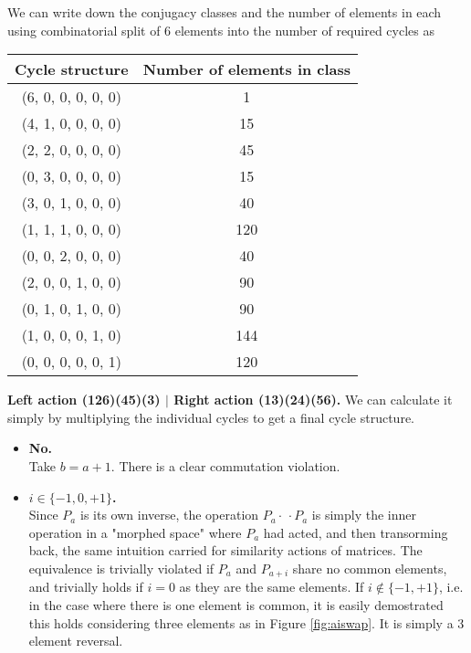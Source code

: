 \begin{alphaparts}
    \questionpart
    We can write down the conjugacy classes and the number of elements in each using 
    combinatorial split of 6 elements into the number of required cycles as 
    \begin{center}
        \begin{tabular*}{0.5\textwidth}[ht]{c c}
            Cycle structure     &  Number of elements in class \\ 
                             \hline
            (6, 0, 0, 0, 0, 0)  &  1                           \\
            (4, 1, 0, 0, 0, 0)  &  15                          \\
            (2, 2, 0, 0, 0, 0)  &  45                          \\
            (0, 3, 0, 0, 0, 0)  &  15                          \\
            (3, 0, 1, 0, 0, 0)  &  40                          \\
            (1, 1, 1, 0, 0, 0)  &  120                         \\
            (0, 0, 2, 0, 0, 0)  &  40                          \\
            (2, 0, 0, 1, 0, 0)  &  90                          \\
            (0, 1, 0, 1, 0, 0)  &  90                          \\
            (1, 0, 0, 0, 1, 0)  &  144                         \\
            (0, 0, 0, 0, 0, 1)  &  120                         \\
        
        \end{tabular*}
    \end{center}

    \textbf{Left action (126)(45)(3) $\mid$ Right action (13)(24)(56).} 
    We can calculate it simply by multiplying the individual
    cycles to get a final cycle structure.

    \questionpart
    \begin{itemize}
        \item \textbf{No.} \\
        Take $b = a + 1$. There is a clear commutation violation.
    
        \item \textbf{$i \in \{-1, 0, +1\}$.} \\
        Since $P_a$ is its own inverse, the operation $P_a \cdot \, \cdot P_a$
        is simply the inner operation in a "morphed space" where $P_a$ had acted, and
        then transorming back, the same intuition carried for similarity actions of matrices.
        The equivalence is trivially violated if $P_a$ and $P_{a+i}$ share no common elements, and 
        trivially holds if $i = 0$ as they are the same elements. If $i \not \in \{-1, +1\}$, i.e. 
        in the case where there is one element is common,
        it is easily demostrated this holds considering three elements 
        as in Figure \ref{fig:aiswap}. It is simply a 3 element reversal.
    \end{itemize}


\end{alphaparts}
